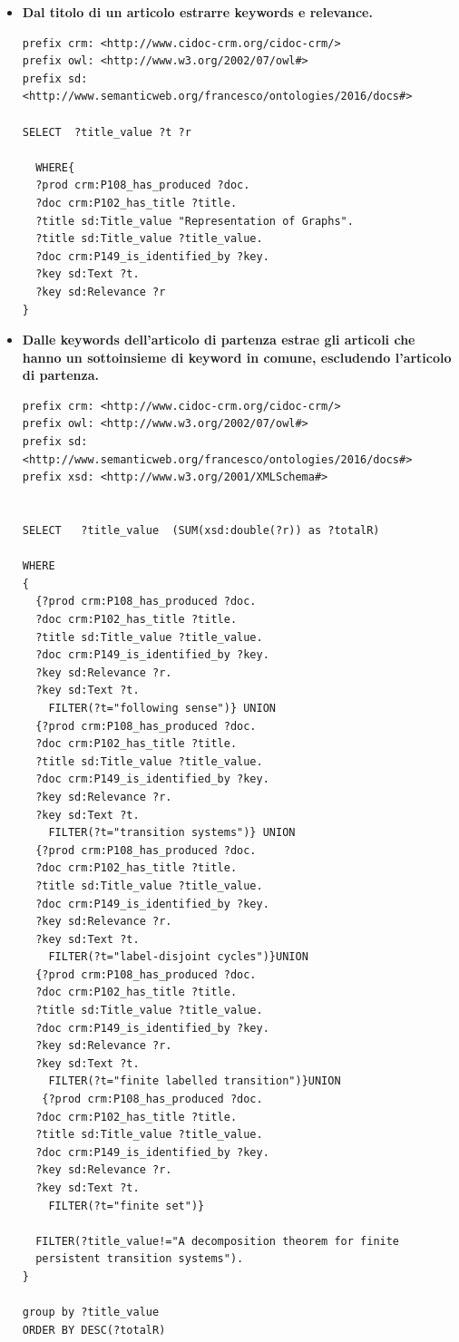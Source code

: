 \documentclass[11pt,a4paper]{article}
\begin{document}
\begin{itemize}
\item \textbf{Dal titolo di un articolo estrarre keywords e relevance.}
\begin{lstlisting}[breaklines=true]
prefix crm: <http://www.cidoc-crm.org/cidoc-crm/>
prefix owl: <http://www.w3.org/2002/07/owl#>
prefix sd: <http://www.semanticweb.org/francesco/ontologies/2016/docs#>

SELECT  ?title_value ?t ?r
 
  WHERE{
  ?prod crm:P108_has_produced ?doc.
  ?doc crm:P102_has_title ?title.
  ?title sd:Title_value "Representation of Graphs".
  ?title sd:Title_value ?title_value.
  ?doc crm:P149_is_identified_by ?key.
  ?key sd:Text ?t.
  ?key sd:Relevance ?r
}
\end{lstlisting}
\end{itemize}

\begin{itemize}
\item \textbf{Dalle keywords dell'articolo di partenza estrae gli articoli che hanno un sottoinsieme di keyword in comune, escludendo l'articolo di partenza.}
\begin{lstlisting}[breaklines=true]
prefix crm: <http://www.cidoc-crm.org/cidoc-crm/>
prefix owl: <http://www.w3.org/2002/07/owl#>
prefix sd: <http://www.semanticweb.org/francesco/ontologies/2016/docs#>
prefix xsd: <http://www.w3.org/2001/XMLSchema#>


SELECT   ?title_value  (SUM(xsd:double(?r)) as ?totalR) 

WHERE
{
  {?prod crm:P108_has_produced ?doc.
  ?doc crm:P102_has_title ?title.
  ?title sd:Title_value ?title_value.
  ?doc crm:P149_is_identified_by ?key.
  ?key sd:Relevance ?r.
  ?key sd:Text ?t.
    FILTER(?t="following sense")} UNION 
  {?prod crm:P108_has_produced ?doc.
  ?doc crm:P102_has_title ?title.
  ?title sd:Title_value ?title_value.
  ?doc crm:P149_is_identified_by ?key.
  ?key sd:Relevance ?r.
  ?key sd:Text ?t.
    FILTER(?t="transition systems")} UNION
  {?prod crm:P108_has_produced ?doc.
  ?doc crm:P102_has_title ?title.
  ?title sd:Title_value ?title_value.
  ?doc crm:P149_is_identified_by ?key.
  ?key sd:Relevance ?r.
  ?key sd:Text ?t.
    FILTER(?t="label-disjoint cycles")}UNION
  {?prod crm:P108_has_produced ?doc.
  ?doc crm:P102_has_title ?title.
  ?title sd:Title_value ?title_value.
  ?doc crm:P149_is_identified_by ?key.
  ?key sd:Relevance ?r.
  ?key sd:Text ?t.
    FILTER(?t="finite labelled transition")}UNION
   {?prod crm:P108_has_produced ?doc.
  ?doc crm:P102_has_title ?title.
  ?title sd:Title_value ?title_value.
  ?doc crm:P149_is_identified_by ?key.
  ?key sd:Relevance ?r.
  ?key sd:Text ?t.
    FILTER(?t="finite set")}
  
  FILTER(?title_value!="A decomposition theorem for finite 
  persistent transition systems").
}

group by ?title_value
ORDER BY DESC(?totalR) 
\end{lstlisting}
\end{itemize}
\end{document}
